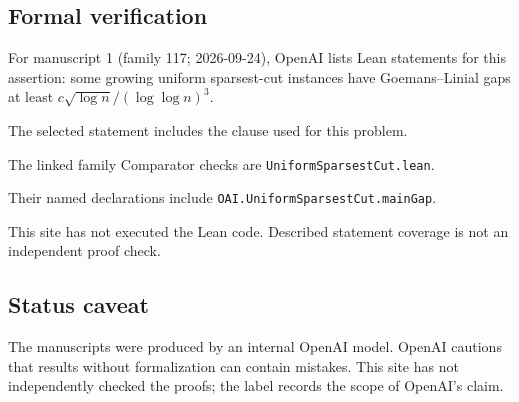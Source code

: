 \documentclass[11pt]{article}
\begin{document}
\subsection{Formal verification}
For manuscript 1 (family 117; 2026-09-24), OpenAI lists Lean statements for this assertion: some growing uniform sparsest-cut instances have Goemans--Linial gaps at least $c\sqrt{\log n}/(\log\log n)^3$.

The selected statement includes the clause used for this problem.

The linked family Comparator checks are \texttt{UniformSparsestCut.lean}.

Their named declarations include \texttt{OAI.UniformSparsestCut.mainGap}.

This site has not executed the Lean code. Described statement coverage is not an independent proof check.

\subsection{Status caveat}
The manuscripts were produced by an internal OpenAI model. OpenAI cautions that results without formalization can contain mistakes. This site has not independently checked the proofs; the label records the scope of OpenAI's claim.
\end{document}
